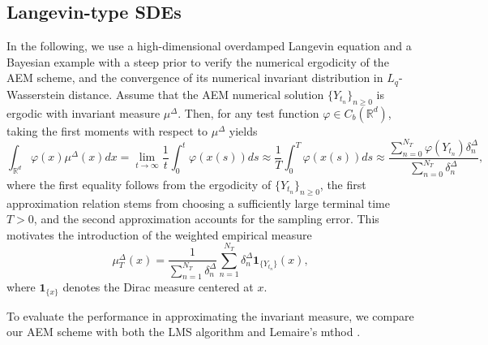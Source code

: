 \documentclass[preprint,12pt,compress]{elsarticle}
\begin{document}
\subsection{Langevin-type SDEs}
In the following, we use a high-dimensional overdamped Langevin equation and a Bayesian example with a steep prior to verify the numerical ergodicity of the AEM scheme, and the convergence of its numerical invariant distribution in $L_q$-Wasserstein distance.
Assume that the AEM numerical solution $\{Y_{t_n}\}_{n\ge0}$ is ergodic with invariant measure $\mu^\Delta$. Then, for any test function $\varphi \in C_b(\mathbb{R}^d)$, taking the first moments with respect to $\mu^\Delta$ yields
\begin{equation*}
	\int_{{\mathbb{R}^d}} {\varphi (x){\mu^\Delta }(x)dx}  = \mathop {\lim }\limits_{t \to \infty } \frac{1}{t}\int_0^t {\varphi(x(s))ds}  \approx \frac{1}{T}\int_0^T {\varphi(x(s))ds}  \approx \frac{{\sum\nolimits_{n = 0}^{{N_T}} {\varphi({Y_{{t_n}}})\delta _n^\Delta } }}{{\sum\nolimits_{n = 0}^{{N_T}} {\delta _n^\Delta } }},
\end{equation*}
where the first equality follows from the ergodicity of $\{Y_{t_n}\}_{n\ge0}$, the first approximation relation stems from choosing a sufficiently large terminal time $T > 0$, and the second approximation accounts for the sampling error.
This motivates the introduction of the weighted empirical measure \cite{lemaire2007an, leroy2024adaptive, lamberton2002recursive}
\begin{equation*}
	\mu _T^\Delta (x) = \frac{1}{{\sum\nolimits_{n = 1}^{{N_T}} {\delta _n^\Delta } }}\sum\limits_{n = 1}^{{N_T}} {\delta _n^\Delta {\mathbf{1}_{\{ {Y_{{t_n}}}\} }}(x)} ,
\end{equation*}
where $\mathbf{1}_{\{x\}}$ denotes the Dirac measure centered at $x$. 

To evaluate the performance in approximating the invariant measure, we compare our AEM scheme with both the LMS algorithm \cite{lamba2007an} and Lemaire's mthod \cite{lemaire2007an}.
\end{document}
